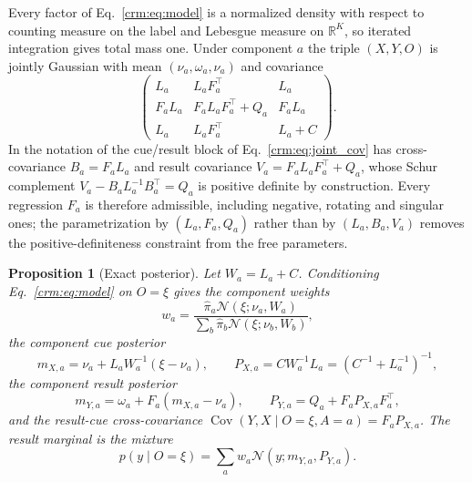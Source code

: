 \documentclass[11pt]{article}
\newtheorem{proposition}[theorem]{Proposition}
\theoremstyle{definition}
\theoremstyle{remark}
\newcommand{\R}{\mathbb R}
\newcommand{\Gauss}{\mathcal N}
\newcommand{\Cov}{\operatorname{Cov}}
\newcommand{\pihat}{\hat\pi}
\begin{document}
Every factor of Eq.~\eqref{crm:eq:model} is a normalized density with respect to counting measure on the label and Lebesgue measure on $\R^K$, so iterated integration gives total mass one. Under component $a$ the triple $(X,Y,O)$ is jointly Gaussian with mean $(\nu_a,\omega_a,\nu_a)$ and covariance
\begin{equation}
\begin{pmatrix}
L_a & L_aF_a^\top & L_a\\
F_aL_a & F_aL_aF_a^\top+Q_a & F_aL_a\\
L_a & L_aF_a^\top & L_a+C
\end{pmatrix}.
\label{crm:eq:joint_cov}
\end{equation}
In the notation of \citet{GhahramaniJordan1994Incomplete} the cue/result block of Eq.~\eqref{crm:eq:joint_cov} has cross-covariance $B_a=F_aL_a$ and result covariance $V_a=F_aL_aF_a^\top+Q_a$, whose Schur complement $V_a-B_aL_a^{-1}B_a^\top=Q_a$ is positive definite by construction. Every regression $F_a$ is therefore admissible, including negative, rotating and singular ones; the parametrization by $(L_a,F_a,Q_a)$ rather than by $(L_a,B_a,V_a)$ removes the positive-definiteness constraint from the free parameters.

\begin{proposition}[Exact posterior]
\label{crm:prop:posterior}
Let $W_a=L_a+C$. Conditioning Eq.~\eqref{crm:eq:model} on $O=\xi$ gives the component weights
\begin{equation}
w_a=\frac{\pihat_a\Gauss(\xi;\nu_a,W_a)}{\sum_b\pihat_b\Gauss(\xi;\nu_b,W_b)},
\label{crm:eq:weights}
\end{equation}
the component cue posterior
\begin{equation}
m_{X,a}=\nu_a+L_aW_a^{-1}(\xi-\nu_a),\qquad P_{X,a}=CW_a^{-1}L_a=(C^{-1}+L_a^{-1})^{-1},
\label{crm:eq:cue_post}
\end{equation}
the component result posterior
\begin{equation}
m_{Y,a}=\omega_a+F_a(m_{X,a}-\nu_a),\qquad P_{Y,a}=Q_a+F_aP_{X,a}F_a^\top,
\label{crm:eq:result_post}
\end{equation}
and the result-cue cross-covariance $\Cov(Y,X\mid O=\xi,A=a)=F_aP_{X,a}$. The result marginal is the mixture
\begin{equation}
p(y\mid O=\xi)=\sum_aw_a\Gauss(y;m_{Y,a},P_{Y,a}).
\label{crm:eq:mixture}
\end{equation}
\end{proposition}
\end{document}
